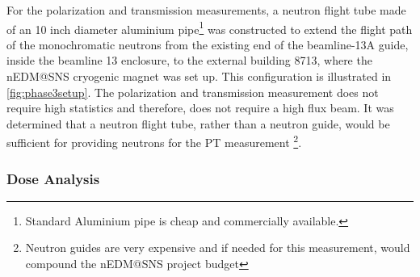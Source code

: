 For the polarization and transmission measurements, a neutron flight tube made of an 10 inch diameter aluminium pipe\footnote{Standard Aluminium pipe is cheap and commercially available.} was constructed to extend the flight path of the monochromatic neutrons from the existing end of the beamline-13A guide, inside the beamline 13 enclosure, to the external building 8713, where the nEDM@SNS cryogenic magnet was set up. This configuration is illustrated in \cref{fig:phase3setup}. The polarization and transmission measurement does not require high statistics and therefore, does not require a high flux beam. It was determined that a neutron flight tube, rather than a neutron guide, would be sufficient for providing neutrons for the PT measurement \footnote{Neutron guides are very expensive and if needed for this measurement, would compound the nEDM@SNS project budget}.


\subsubsection{Dose Analysis}


